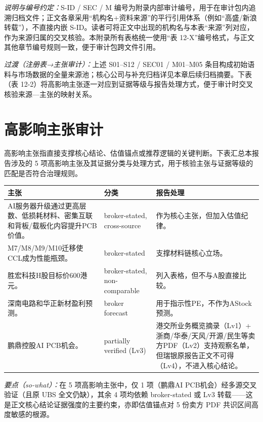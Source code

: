 \noindent\textit{说明与编号约定：}S-ID / SEC / M 编号为附录内部审计编号，用于在审计包内追溯归档文件；正文各章采用``机构名+资料来源''的平行引用体系（例如``高盛/新浪转载''），不直接内嵌 S-ID。读者可将正文中出现的机构名与本表``来源''列对应，作为来源归属的交叉核验。本附录所有表格统一使用``表 12-X''编号格式，与正文其他章节编号规则一致，便于审计包跨文件引用。

\noindent\textit{过渡（注册表→主张审计）：}上述 S01--S12 / SEC01 / M01--M05 条目构成初始语料与市场数据的全量来源池；核心公司与补充归档详见本章后续归档摘要。下表（表 12-2）将高影响主张逐一对应到证据等级与报告处理方式，便于审计时交叉核验来源—主张的映射关系。

\section{高影响主张审计}

高影响主张指直接支撑核心结论、估值锚点或推荐逻辑的关键判断。下表汇总本报告涉及的 5 项高影响主张及其证据分类与处理方式，用于核验主张与证据等级的匹配是否符合治理规则。

\begin{exhibitbox}[表 12-2：高影响主张处理审计]
\footnotesize
\begin{tabularx}{\linewidth}{X L{3cm}L{3.4cm}}
\toprule
\textbf{主张} & \textbf{分类} & \textbf{报告处理} \\
\midrule
AI服务器升级通过更高层数、低损耗材料、密集互联和背板/载板化内容提升PCB价值。 & broker-stated, cross-source & 作为核心主张，但加入估值纪律。 \\
M7/M8/M9/M10迁移使CCL成为性能瓶颈。 & broker-stated & 支撑材料链核心立场。 \\
胜宏科技H股目标价600港元。 & broker-stated, non-comparable & 列入表格，但不与A股直接比较。 \\
深南电路和华正新材盈利预测。 & broker forecast & 用于指示性PE，不作为AStock预测。 \\
鹏鼎控股AI PCB机会。 & partially verified (Lv3) & 港交所业务概览摘录（Lv1）+ 浙商/华泰/天风/开源/民生等卖方PDF（Lv2）支持观察名单，但瑞银原报告正文不可得（Lv4），不进入核心结论。 \\
\bottomrule
\end{tabularx}
\end{exhibitbox}

\noindent\textit{要点（so-what）：}在 5 项高影响主张中，仅 1 项（鹏鼎AI PCB机会）经多源交叉验证（且原 UBS 全文仍缺），其余 4 项均依赖 broker-stated 或 Lv3 转载——这是正文核心结论证据强度的主要约束，亦即估值锚点对 5 份卖方 PDF 共识区间高度敏感的根源。

